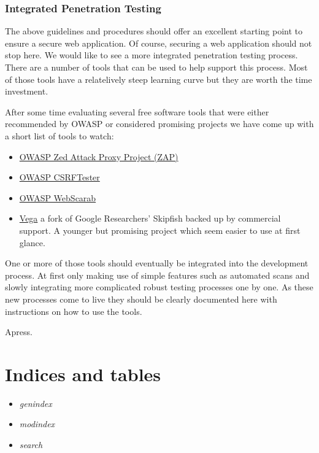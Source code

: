 \documentclass[letterpaper,10pt,english]{sphinxmanual}
\begin{document}
\subsection{Integrated Penetration Testing}
\label{developer-guide:integrated-penetration-testing}
The above guidelines and procedures should offer an excellent starting
point to ensure a secure web application. Of course, securing a web
application should not stop here. We would like to see a more
integrated penetration testing process. There are a number of tools
that can be used to help support this process. Most of those tools
have a relatelively steep learning curve but they are worth the time
investment.

After some time evaluating several free software tools that were
either recommended by OWASP or considered promising projects we have
come up with a short list of tools to watch:
\begin{itemize}
\item {} 
\href{https://www.owasp.org/index.php/OWASP\_Zed\_Attack\_Proxy\_Project}{OWASP Zed Attack Proxy Project (ZAP)}

\item {} 
\href{https://www.owasp.org/index.php/Category:OWASP\_CSRFTester\_Project}{OWASP CSRFTester}

\item {} 
\href{https://www.owasp.org/index.php/Category:OWASP\_WebScarab\_Project}{OWASP WebScarab}

\item {} 
\href{http://www.subgraph.com/}{Vega} a fork of Google Researchers' Skipfish backed up by
commercial support. A younger but promising project which seem
easier to use at first glance.

\end{itemize}

One or more of those tools should eventually be integrated into the
development process. At first only making use of simple features such
as automated scans and slowly integrating more complicated robust
testing processes one by one. As these new processes come to live they
should be clearly documented here with instructions on how to use the
tools.

Apress.


\chapter{Indices and tables}
\label{index:indices-and-tables}\begin{itemize}
\item {} 
\emph{genindex}

\item {} 
\emph{modindex}

\item {} 
\emph{search}

\end{itemize}
\end{document}
